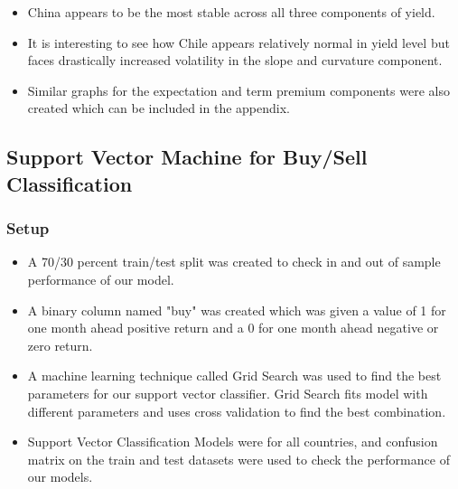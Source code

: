 \documentclass{article}
\begin{document}
\begin{itemize}
  \item China appears to be the most stable across all three components of yield.
  \item It is interesting to see how Chile appears relatively normal in yield level but faces drastically increased volatility in the slope and curvature component.
  \item Similar graphs for the expectation and term premium components were also created which can be included in the appendix.
\end{itemize}

\newpage

\subsection{Support Vector Machine for Buy/Sell Classification}
\vspace*{5mm}

\subsubsection{Setup}

\vspace*{5mm}

\begin{itemize}
  \item A 70/30 percent train/test split was created to check in and out of sample performance of our model.
  \item A binary column named "buy" was created which was given a value of 1 for one month ahead positive return and a 0 for one month ahead negative or zero return.
  \item A machine learning technique called Grid Search was used to find the best parameters for our support vector classifier. Grid Search fits model with different
  parameters and uses cross validation to find the best combination.
  \item Support Vector Classification Models were for all countries, and confusion matrix on the train and test datasets were used to check the performance of our models.
\end{itemize}
\end{document}
